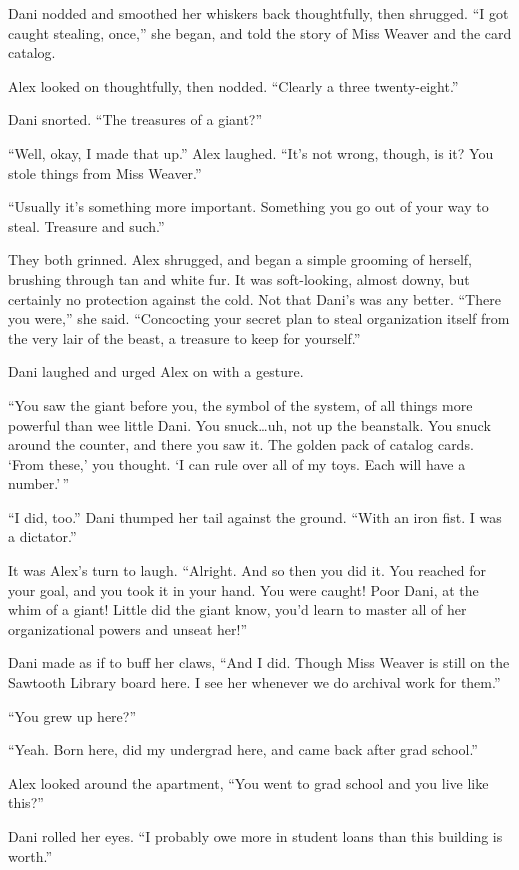 Dani nodded and smoothed her whiskers back thoughtfully, then shrugged. ``I got caught stealing, once,'' she began, and told the story of Miss Weaver and the card catalog.

Alex looked on thoughtfully, then nodded. ``Clearly a three twenty-eight.''

Dani snorted. ``The treasures of a giant?''

``Well, okay, I made that up.'' Alex laughed. ``It's not wrong, though, is it? You stole things from Miss Weaver.''

``Usually it's something more important. Something you go out of your way to steal. Treasure and such.''

They both grinned. Alex shrugged, and began a simple grooming of herself, brushing through tan and white fur. It was soft-looking, almost downy, but certainly no protection against the cold. Not that Dani's was any better. ``There you were,'' she said. ``Concocting your secret plan to steal organization itself from the very lair of the beast, a treasure to keep for yourself.''

Dani laughed and urged Alex on with a gesture.

``You saw the giant before you, the symbol of the system, of all things more powerful than wee little Dani. You snuck\ldots{}uh, not up the beanstalk. You snuck around the counter, and there you saw it. The golden pack of catalog cards. `From these,' you thought. `I can rule over all of my toys. Each will have a number.'\,''

``I did, too.'' Dani thumped her tail against the ground. ``With an iron fist. I was a dictator.''

It was Alex's turn to laugh. ``Alright. And so then you did it. You reached for your goal, and you took it in your hand. You were caught! Poor Dani, at the whim of a giant! Little did the giant know, you'd learn to master all of her organizational powers and unseat her!''

Dani made as if to buff her claws, ``And I did. Though Miss Weaver is still on the Sawtooth Library board here. I see her whenever we do archival work for them.''

``You grew up here?''

``Yeah. Born here, did my undergrad here, and came back after grad school.''

Alex looked around the apartment, ``You went to grad school and you live like this?''

Dani rolled her eyes. ``I probably owe more in student loans than this building is worth.''

